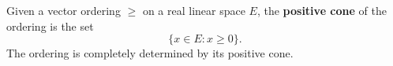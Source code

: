 Given a vector ordering $\geq$ on a real linear space $E$, the \textbf{positive cone} of the ordering is the set
$$
\{x \in E : x \geq 0\}.
$$
The ordering is completely determined by its positive cone.
